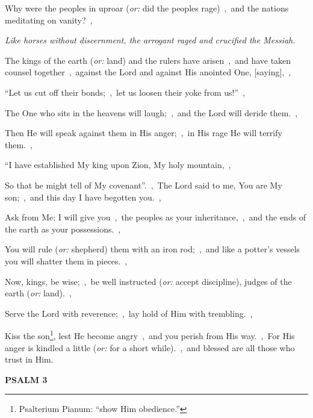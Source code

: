 \documentclass[12pt,twoside,a5paper]{article}
\newcommand{\psalm}[1]{\textbf{PSALM {#1}}\nopagebreak}
\newcommand{\qanona}[1]{{\liturgicalhint{Qanona.} \emph{#1}}}
\newcommand{\translationoption}[1]{\emph{or:} #1}
\begin{document}
\begin{normalparskip}
  Why were the peoples in uproar (\translationoption{did the peoples rage})~\sep\ and the nations meditating on vanity?~\sep

  \qanona{Like horses without discernment, the arrogant raged and crucified the Messiah.}

  The kings of the earth (\translationoption{land}) and the rulers have arisen~\sep\ and have taken counsel together~\sep\ against the Lord and against His anointed One, [saying],~\sep

  ``Let us cut off their bonds;~\sep\ let us loosen their yoke from us!''~\sep

  The One who sits in the heavens will laugh;~\sep\ and the Lord will deride them.~\sep

  Then He will speak against them in His anger;~\sep\ in His rage He will terrify them.~\sep

  ``I have established My king upon Zion, My holy mountain,~\sep

  So that he might tell of My covenant''.~\sep\ The Lord said to me, You are My son;~\sep\ and this day I have begotten you.~\sep

  Ask from Me; I will give you~\sep\ the peoples as your inheritance,~\sep\ and the ends of the earth as your possessions.~\sep

  You will rule (\translationoption{shepherd}) them with an iron rod;~\sep\ and like a potter's vessels you will shatter them in pieces.~\sep

  Now, kings, be wise;~\sep\ be well instructed (\translationoption{accept discipline}), judges of the earth (\translationoption{land}).~\sep

  Serve the Lord with reverence;~\sep\ lay hold of Him with trembling.~\sep

  Kiss the son\footnote{Psalterium Pianum: ``show Him obedience.''}, lest He become angry~\sep\ and you perish from His way.~\sep\ For His anger is kindled a little (\translationoption{for a short while}).~\sep\ and blessed are all those who trust in Him.
\end{normalparskip}

\psalm{3}
\end{document}
